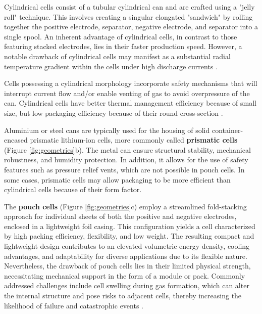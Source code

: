 Cylindrical cells consist of a tubular cylindrical can and are crafted using a "jelly roll" technique. This involves creating a singular elongated "sandwich" by rolling together the positive electrode, separator, negative electrode, and separator into a single spool. An inherent advantage of cylindrical cells, in contrast to those featuring stacked electrodes, lies in their faster production speed. However, a notable drawback of cylindrical cells may manifest as a substantial radial temperature gradient within the cells under high discharge currents \cite{baazouzi2023design}.

Cells possessing a cylindrical morphology incorporate safety mechanisms that will interrupt current flow and/or enable venting of gas to avoid overpressure of the can. Cylindrical cells have better thermal management efficiency because of small size, but low packaging efficiency because of their round cross-section \cite{das2018joining}.

Aluminium or steel cans are typically used for the housing of solid container-encased prismatic lithium-ion cells, more commonly called \textbf{prismatic cells} (Figure \ref{fig:geometries}b). The metal can ensure structural stability, mechanical robustness, and humidity protection. In addition, it allows for the use of safety features such as pressure relief vents, which are not possible in pouch cells. In some cases, prismatic cells may allow packaging to be more efficient than cylindrical cells because of their form factor\cite{das2018joining}.

The \textbf{pouch cells} (Figure \ref{fig:geometries}c) employ a streamlined fold-stacking approach for individual sheets of both the positive and negative electrodes, enclosed in a lightweight foil casing. This configuration yields a cell characterized by high packing efficiency, flexibility, and low weight. The resulting compact and lightweight design contributes to an elevated volumetric energy density, cooling advantages, and adaptability for diverse applications due to its flexible nature. Nevertheless, the drawback of pouch cells lies in their limited physical strength, necessitating mechanical support in the form of a module or pack. Commonly addressed challenges include cell swelling during gas formation, which can alter the internal structure and pose risks to adjacent cells, thereby increasing the likelihood of failure and catastrophic events \cite{santhanagopalan2013modeling}.

